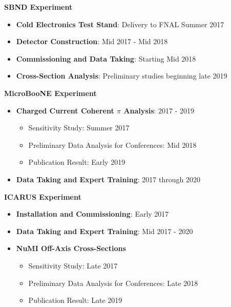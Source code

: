 \noindent\textbf{SBND Experiment}
\begin{itemize}[noitemsep,nolistsep]
\item{\textbf{Cold Electronics Test Stand}}: Delivery to FNAL Summer 2017
\item{\textbf{Detector Construction}}: Mid 2017 - Mid 2018
\item{\textbf{Commissioning and Data Taking}}: Starting Mid 2018 
\item{\textbf{Cross-Section Analysis}}: Preliminary studies beginning late 2019

\end{itemize}

\noindent\textbf{MicroBooNE Experiment}
\begin{itemize}[noitemsep,nolistsep]
\item{\textbf{Charged Current Coherent $\pi$ Analysis}}: 2017 - 2019
\begin{itemize}[noitemsep,nolistsep]
\item{Sensitivity Study: Summer 2017}
\item{Preliminary Data Analysis for Conferences: Mid 2018}
\item{Publication Result: Early 2019}
\end{itemize}

\item{\textbf{Data Taking and Expert Training}}: 2017 through 2020

\end{itemize}


\noindent\textbf{ICARUS Experiment}

\begin{itemize}[noitemsep,nolistsep]
\item{\textbf{Installation and Commissioning}}: Early 2017
\item{\textbf{Data Taking and Expert Training}}: Mid 2017 - 2020
\item{\textbf{NuMI Off-Axis Cross-Sections}}
\begin{itemize}[noitemsep,nolistsep]
\item{Sensitivity Study: Late 2017}
\item{Preliminary Data Analysis for Conferences: Late 2018}
\item{Publication Result: Late 2019}
\end{itemize}

\end{itemize}

